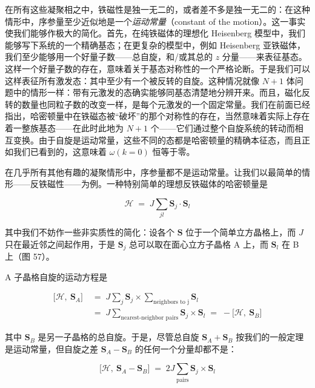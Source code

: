 在所有这些凝聚相之中，铁磁性是独一无二的，或者差不多是独一无二的：在这种情形中，序参量至少近似地是一个\emph{运动常量}（constant of the motion）。这一事实使我们能够作极大的简化。首先，在纯铁磁体的理想化 Heisenberg 模型中，我们能够写下系统的一个精确基态；在更复杂的模型中，例如 Heisenberg 亚铁磁体，我们至少能够用一个好量子数——总自旋，和/或其总的 $z$ 分量——来表征基态。这样一个好量子数的存在，意味着关于基态对称性的一个严格论断。于是我们可以这样表征所有激发态：其中至少有一个被反转的自旋。这种情况就像 $N+1$ 体问题中的情形一样：带有元激发的态确实能够同基态清楚地分辨开来。而且，磁化反转的数量也同粒子数的改变一样，是每个元激发的一个固定常量。我们在前面已经指出，哈密顿量中在铁磁态被“破坏”的那个对称性的存在，当然意味着实际上存在着一整族基态——在此时此地为 $N+1$ 个——它们通过整个自旋系统的转动而相互变换。由于自旋是运动常量，这些不同的态都是哈密顿量的精确本征态，而且正如我们已看到的，这意味着 $\omega(k{=}0)$ 恒等于零。

在几乎所有其他有趣的凝聚情形中，序参量都不是运动常量。让我们以最简单的情形——反铁磁性——为例。一种特别简单的理想反铁磁体的哈密顿量是

\begin{equation*}
\mathcal{H} \;=\; J\sum_{jl} \mathbf{S}_j\cdot\mathbf{S}_l
\end{equation*}

其中我们不妨作一些非实质性的简化：设各个 $\mathbf{S}$ 位于一个简单立方晶格上，而 $J$ 只在最近邻之间起作用，于是 $\mathbf{S}_j$ 总可以取在面心立方子晶格 A 上，而 $\mathbf{S}_l$ 在 B 上（图 57）。

A 子晶格自旋的运动方程是

\begin{align*}
\bigl[\mathcal{H},\ \mathbf{S}_A\bigr] \;&=\; J\sum_j \mathbf{S}_j \times \sum_{\text{neighbors to j}} \mathbf{S}_l \\
&=\; J\sum_{\text{nearest-neighbor pairs}} \mathbf{S}_j \times \mathbf{S}_l \;=\; -\bigl[\mathcal{H},\ \mathbf{S}_B\bigr]
\end{align*}

其中 $\mathbf{S}_B$ 是另一子晶格的总自旋。于是，尽管总自旋 $\mathbf{S}_A + \mathbf{S}_B$ 按我们的一般定理是运动常量，但自旋之差 $\mathbf{S}_A - \mathbf{S}_B$ 的任何一个分量却都不是：

\begin{equation*}
\bigl[\mathcal{H},\ \mathbf{S}_A - \mathbf{S}_B\bigr] \;=\; 2J\sum_{\text{pairs}} \mathbf{S}_j \times \mathbf{S}_l
\end{equation*}

